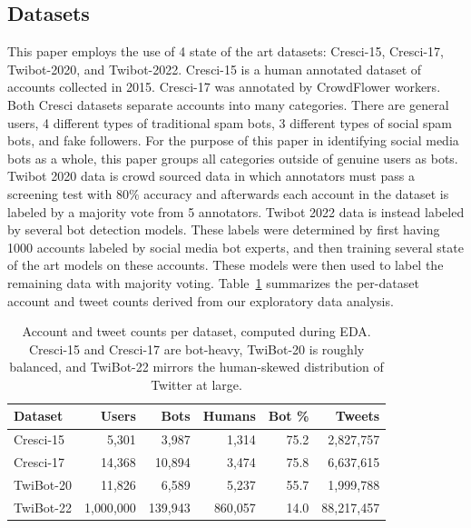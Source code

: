 \subsection{Datasets}\label{sec:datasets}
This paper employs the use of 4 state of the art datasets: Cresci-15, Cresci-17, Twibot-2020, and Twibot-2022. Cresci-15 is a human annotated dataset of accounts collected in 2015. Cresci-17 was annotated by CrowdFlower workers. Both Cresci datasets separate accounts into many categories. There are general users, 4 different types of traditional spam bots, 3 different types of social spam bots, and fake followers. For the purpose of this paper in identifying social media bots as a whole, this paper groups all categories outside of genuine users as bots. Twibot 2020 data is crowd sourced data in which annotators must pass a screening test with $80\%$ accuracy and afterwards each account in the dataset is labeled by a majority vote from 5 annotators. Twibot 2022 data is instead labeled by several bot detection models. These labels were determined by first having 1000 accounts labeled by social media bot experts, and then training several state of the art models on these accounts. These models were then used to label the remaining data with majority voting. Table~\ref{tab:dataset-stats} summarizes the per-dataset account and tweet counts derived from our exploratory data analysis.

\begin{table}[H]
  \centering
  \footnotesize
  \setlength{\tabcolsep}{3pt}
  \begin{tabular}{lrrrrr}
    \toprule
    Dataset & Users & Bots & Humans & Bot \% & Tweets \\
    \midrule
    Cresci-15  & 5{,}301        & 3{,}987    & 1{,}314    & 75.2 & 2{,}827{,}757  \\
    Cresci-17  & 14{,}368       & 10{,}894   & 3{,}474    & 75.8 & 6{,}637{,}615  \\
    TwiBot-20  & 11{,}826       & 6{,}589    & 5{,}237    & 55.7 & 1{,}999{,}788  \\
    TwiBot-22  & 1{,}000{,}000  & 139{,}943  & 860{,}057  & 14.0 & 88{,}217{,}457 \\
    \bottomrule
  \end{tabular}
  \caption{Account and tweet counts per dataset, computed during EDA. Cresci-15 and Cresci-17 are bot-heavy, TwiBot-20 is roughly balanced, and TwiBot-22 mirrors the human-skewed distribution of Twitter at large.}
  \label{tab:dataset-stats}
\end{table}

